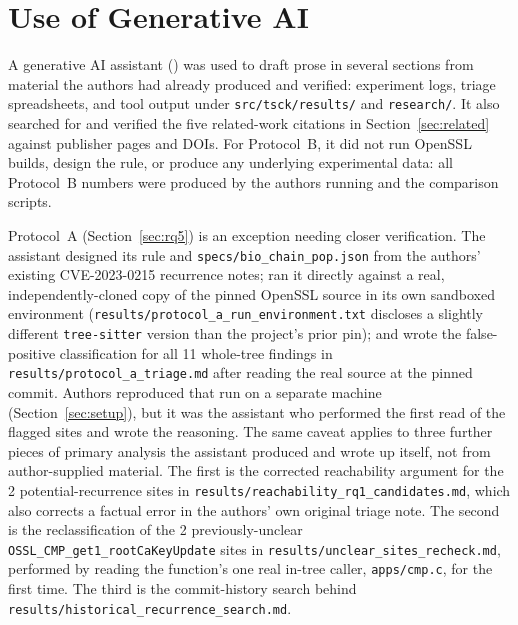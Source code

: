 \section*{Use of Generative AI}

A generative AI assistant () was used to draft
prose in several sections from material the authors had already
produced and verified: experiment logs, triage spreadsheets, and tool
output under \texttt{src/tsck/results/} and \texttt{research/}. It also
searched for and verified the five related-work citations in
Section~\ref{sec:related} against publisher pages and DOIs. For
Protocol~B, it did not run OpenSSL builds, design the rule, or produce
any underlying experimental data: all Protocol~B numbers were produced
by the authors running \tool and the comparison scripts.

Protocol~A (Section~\ref{sec:rq5}) is an exception needing closer
verification. The assistant designed its rule and
\texttt{specs/bio\_chain\_pop.json} from the authors' existing
CVE-2023-0215 recurrence notes; ran it directly against a real,
independently-cloned copy of the pinned OpenSSL source in its own
sandboxed environment (\texttt{results/protocol\_a\_run\_environment.txt}
discloses a slightly different \texttt{tree-sitter} version than the
project's prior pin); and wrote the false-positive classification for
all 11 whole-tree findings in \texttt{results/protocol\_a\_triage.md}
after reading the real source at the pinned commit. Authors reproduced
that run on a separate machine (Section~\ref{sec:setup}), but it was the
assistant who performed the first read of the flagged sites and wrote
the reasoning. The same caveat applies to three further pieces of primary
analysis the assistant produced and wrote up itself, not from
author-supplied material. The first is the corrected reachability
argument for the 2 potential-recurrence sites in
\texttt{results/reachability\_rq1\_candidates.md}, which also corrects a
factual error in the authors' own original triage note. The second is the
reclassification of the 2 previously-unclear
\texttt{OSSL\_CMP\_get1\_rootCaKeyUpdate} sites in
\texttt{results/unclear\_sites\_recheck.md}, performed by reading the
function's one real in-tree caller, \texttt{apps/cmp.c}, for the first
time. The third is the commit-history search behind
\texttt{results/historical\_recurrence\_search.md}. 
